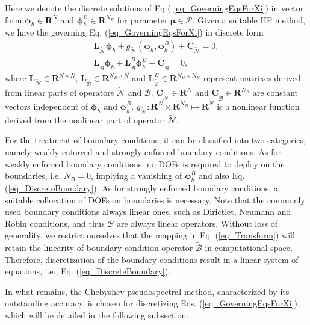 \documentclass[preprint, 10pt]{elsarticle}
\begin{document}
Here we denote the discrete solutions of Eq ( \ref{eq_GoverningEqsForXi}) in vector form $\pmb{\phi} _h \in \mathbf{R}^{N  }$ and $\pmb{\phi} _h^{B} \in \mathbf{R}^{N_B}$ for parameter $\pmb{\mu}  \in \mathcal{P}$.
Given a suitable HF method, we have the governing Eq. (\ref{eq_GoverningEqsForXi}) in discrete form
\begin{align}
\mathbf{L}_{\widetilde {\mathcal{N}}}\pmb{\phi}_h +g_{\widetilde {\mathcal{N}}}(\pmb{\phi}_h, \pmb{\phi}_h^{B})
+\mathbf{C}_{\widetilde {\mathcal{N}}}
= 0,
\label{eq_DiscreteEqs}
\\
\mathbf{L}_{\widetilde {\mathcal{B}}} \pmb{\phi}_h + \mathbf{L}_{\widetilde {\mathcal{B}}}^{B} \pmb{\phi}_h^{B}
+\mathbf{C}_{\widetilde {\mathcal{B}}}
= 0,
\label{eq_DiscreteBoundary}
\end{align}
where $\mathbf{L}_{\widetilde {\mathcal{N}}} \in \mathbf{R}^{N \times N}$, $\mathbf{L}_{\widetilde {\mathcal{B}}} \in \mathbf{R}^{N_B \times N}$ and $\mathbf{L}_{\widetilde {\mathcal{B}}}^{B} \in \mathbf{R}^{N_B \times N_B}$ represent matrixes derived from linear parts of operators $\widetilde {\mathcal{N}}$ and $\widetilde {\mathcal{B}}$.
$\mathbf{C}_{\widetilde {\mathcal{N}}} \in \mathbf{R}^{N}$ and $\mathbf{C}_{\widetilde {\mathcal{B}}} \in \mathbf{R}^{N_B}$ are constant vectors independent of $\pmb{\phi} _h$ and $\pmb{\phi} _h^B$.
$g_{\widetilde {\mathcal{N}}}: \mathbf{R}^N \times \mathbf{R}^{N_B} \mapsto \mathbf{R}^N$ is a nonlinear function derived from the nonlinear part of operator $\widetilde {\mathcal{N}}$.

For the treatment of boundary conditions, it can be classified into two categories, namely weakly enforced and strongly enforced boundary conditions.
As for weakly enforced boundary conditions, no DOFs is required to deploy on the boundaries, i.e. $N_B=0$, implying a vanishing of $\pmb{\phi} _h^{B}$ and also Eq. (\ref{eq_DiscreteBoundary}). As for strongly enforced boundary conditions, a suitable collocation of DOFs on boundaries is necessary. Note that the commonly used boundary conditions always linear ones, such as Dirictlet, Neumann and Robin conditions, and thus $\mathcal{B}$ are always linear operators. Without loss of generality, we restrict ourselves that the mapping in Eq. (\ref{eq_Transform}) will retain the linearity of boundary condition operator $\widetilde {\mathcal{B}}$ in computational space. Therefore, discretization of the boundary conditions result in a linear system of equations, i.e., Eq. (\ref{eq_DiscreteBoundary}).

In what remains, the Chebyshev pseudospectral method, characterized by its outstanding accuracy, is chosen for discretizing Eqs. (\ref{eq_GoverningEqsForXi}),  which will be detailed in the following subsection.
\end{document}
